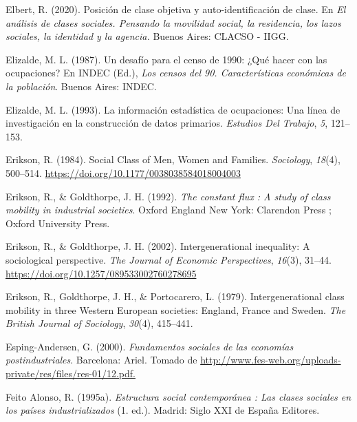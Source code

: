 \documentclass[
]{article}
\newlength{\cslhangindent}
\newlength{\cslentryspacingunit} %
\newenvironment{CSLReferences}[2] %
 {%
  \setlength{\parindent}{0pt}
  \ifodd #1
  \let\oldpar\par
  \def\par{\hangindent=\cslhangindent\oldpar}
  \fi
  \setlength{\parskip}{#2\cslentryspacingunit}
 }%
 {}
\begin{document}
\begin{CSLReferences}{1}{0}
\leavevmode{}%
Elbert, R. (2020). Posición de clase objetiva y auto-identificación de clase. En \emph{El análisis de clases sociales. {Pensando} la movilidad social, la residencia, los lazos sociales, la identidad y la agencia.} Buenos Aires: CLACSO - IIGG.

\leavevmode{}%
Elizalde, M. L. (1987). Un desafío para el censo de 1990: ¿Qué hacer con las ocupaciones? En INDEC (Ed.), \emph{Los censos del 90. {Características} económicas de la población}. Buenos Aires: INDEC.

\leavevmode{}%
Elizalde, M. L. (1993). La información estadística de ocupaciones: {Una} línea de investigación en la construcción de datos primarios. \emph{Estudios Del Trabajo}, \emph{5}, 121--153.

\leavevmode{}%
Erikson, R. (1984). Social {Class} of {Men}, {Women} and {Families}. \emph{Sociology}, \emph{18}(4), 500--514. \url{https://doi.org/10.1177/0038038584018004003}

\leavevmode{}%
Erikson, R., \& Goldthorpe, J. H. (1992). \emph{The constant flux : A study of class mobility in industrial societies}. Oxford England New York: Clarendon Press ; Oxford University Press.

\leavevmode{}%
Erikson, R., \& Goldthorpe, J. H. (2002). Intergenerational inequality: {A} sociological perspective. \emph{The Journal of Economic Perspectives}, \emph{16}(3), 31--44. \url{https://doi.org/10.1257/089533002760278695}

\leavevmode{}%
Erikson, R., Goldthorpe, J. H., \& Portocarero, L. (1979). Intergenerational class mobility in three {Western} {European} societies: {England}, {France} and {Sweden}. \emph{The British Journal of Sociology}, \emph{30}(4), 415--441.

\leavevmode{}%
Esping-Andersen, G. (2000). \emph{Fundamentos sociales de las economías postindustriales}. Barcelona: Ariel. Tomado de \href{http://www.fes-web.org/uploads-private/res/files/res-01/12.pdf}{http://www.fes-web.org/uploads-private/res/files/res-01/12.pdf.}

\leavevmode{}%
Feito Alonso, R. (1995a). \emph{Estructura social contemporánea : Las clases sociales en los países industrializados} (1. ed.). Madrid: Siglo XXI de España Editores.


\end{CSLReferences}
\end{document}
